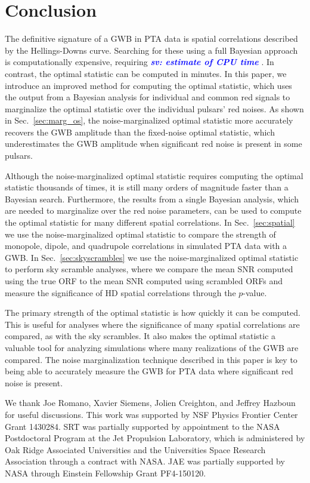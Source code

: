 \documentclass[twocolumn,aps,prd,superscriptaddress]{revtex4-1}
\newcommand{\sv}[1]{\textcolor{blue}{\it{\textbf{sv: #1}}} }
\begin{document}
\section{Conclusion}
\label{sec:conclusion}

The definitive signature of a GWB in PTA data is spatial correlations 
described by the Hellings-Downs curve. 
Searching for these using a full Bayesian approach is computationally expensive, 
requiring \sv{estimate of CPU time}. 
In contrast, the optimal statistic can be computed in minutes. 
In this paper, we introduce an improved method 
for computing the optimal statistic, 
which uses the output from a Bayesian analysis 
for individual and common red signals 
to marginalize the optimal statistic over the individual pulsars' red noises. 
As shown in Sec.~\ref{sec:marg_os}, 
the noise-marginalized optimal statistic more accurately recovers the GWB amplitude 
than the fixed-noise optimal statistic, which underestimates the GWB amplitude 
when significant red noise is present in some pulsars.

Although the noise-marginalized optimal statistic 
requires computing the optimal statistic thousands of times, 
it is still many orders of magnitude faster than a Bayesian search. 
Furthermore, the results from a single Bayesian analysis, 
which are needed to marginalize over the red noise parameters, 
can be used to compute the optimal statistic for many different spatial correlations. 
In Sec.~\ref{sec:spatial} we use the noise-marginalized optimal statistic 
to compare the strength of monopole, dipole, and quadrupole correlations 
in simulated PTA data with a GWB. 
In Sec.~\ref{sec:skyscrambles} we use the noise-marginalized optimal statistic 
to perform sky scramble analyses, where we compare the mean SNR 
computed using the true ORF to the mean SNR computed using scrambled ORFs 
and measure the significance of HD spatial correlations through the $p$-value.

The primary strength of the optimal statistic is how quickly it can be computed. 
This is useful for analyses where the significance of many spatial correlations are compared, 
as with the sky scrambles. 
It also makes the optimal statistic a valuable tool for analyzing simulations 
where many realizations of the GWB are compared. 
The noise marginalization technique described in this paper is key 
to being able to accurately measure the GWB for PTA data 
where significant red noise is present.


\acknowledgments
We thank Joe Romano, Xavier Siemens, Jolien Creighton, and Jeffrey Hazboun for useful discussions. 
This work was supported by NSF Physics Frontier Center Grant 1430284. 
SRT was partially supported by appointment to the NASA Postdoctoral Program 
at the Jet Propulsion Laboratory, which is administered by Oak Ridge Associated Universities 
and the Universities Space Research Association through a contract with NASA. 
JAE was partially supported by NASA through Einstein Fellowship Grant PF4-150120. 




\end{document}
